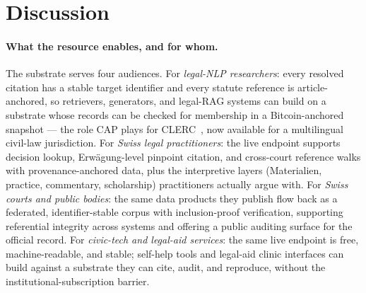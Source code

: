 \documentclass[11pt,a4paper]{article}
\begin{document}
\section{Discussion}\label{sec:disc}

\paragraph{What the resource enables, and for whom.} The substrate serves four audiences. For \emph{legal-NLP researchers}: every resolved citation has a stable target identifier and every statute reference is article-anchored, so retrievers, generators, and legal-RAG systems can build on a substrate whose records can be checked for membership in a Bitcoin-anchored snapshot --- the role CAP plays for CLERC~\citep{hou2024clerc}, now available for a multilingual civil-law jurisdiction. For \emph{Swiss legal practitioners}: the live endpoint supports decision lookup, Erwägung-level pinpoint citation, and cross-court reference walks with provenance-anchored data, plus the interpretive layers (Materialien, practice, commentary, scholarship) practitioners actually argue with. For \emph{Swiss courts and public bodies}: the same data products they publish flow back as a federated, identifier-stable corpus with inclusion-proof verification, supporting referential integrity across systems and offering a public auditing surface for the official record. For \emph{civic-tech and legal-aid services}: the same live endpoint is free, machine-readable, and stable; self-help tools and legal-aid clinic interfaces can build against a substrate they can cite, audit, and reproduce, without the institutional-subscription barrier.
\end{document}
